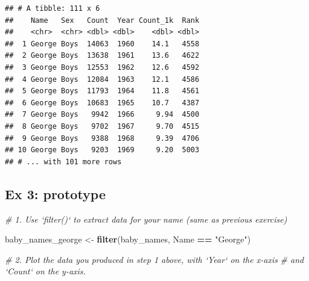 \documentclass[]{book}
\newenvironment{Shaded}{\begin{snugshade}}{\end{snugshade}}
\newcommand{\CommentTok}[1]{\textcolor[rgb]{0.56,0.35,0.01}{\textit{#1}}}
\newcommand{\KeywordTok}[1]{\textcolor[rgb]{0.13,0.29,0.53}{\textbf{#1}}}
\newcommand{\NormalTok}[1]{#1}
\newcommand{\OperatorTok}[1]{\textcolor[rgb]{0.81,0.36,0.00}{\textbf{#1}}}
\newcommand{\StringTok}[1]{\textcolor[rgb]{0.31,0.60,0.02}{#1}}
\begin{document}
\begin{Shaded}
\end{Shaded}

\begin{verbatim}
## # A tibble: 111 x 6
##    Name   Sex   Count  Year Count_1k  Rank
##    <chr>  <chr> <dbl> <dbl>    <dbl> <dbl>
##  1 George Boys  14063  1960    14.1   4558
##  2 George Boys  13638  1961    13.6   4622
##  3 George Boys  12553  1962    12.6   4592
##  4 George Boys  12084  1963    12.1   4586
##  5 George Boys  11793  1964    11.8   4561
##  6 George Boys  10683  1965    10.7   4387
##  7 George Boys   9942  1966     9.94  4500
##  8 George Boys   9702  1967     9.70  4515
##  9 George Boys   9388  1968     9.39  4706
## 10 George Boys   9203  1969     9.20  5003
## # ... with 101 more rows
\end{verbatim}

\hypertarget{ex-3-prototype}{%
\subsection{Ex 3: prototype}\label{ex-3-prototype}}

\begin{Shaded}
\begin{Highlighting}[]
\CommentTok{# 1. Use `filter()` to extract data for your name (same as previous exercise)  }
\end{Highlighting}
\end{Shaded}

\begin{Shaded}
\begin{Highlighting}[]
\NormalTok{baby_names_george <-}\StringTok{ }\KeywordTok{filter}\NormalTok{(baby_names, Name }\OperatorTok{==}\StringTok{ "George"}\NormalTok{)}
\end{Highlighting}
\end{Shaded}

\begin{Shaded}
\begin{Highlighting}[]
\CommentTok{# 2.  Plot the data you produced in step 1 above, with `Year` on the x-axis}
\CommentTok{#     and `Count` on the y-axis.}
\end{Highlighting}
\end{Shaded}
\end{document}
